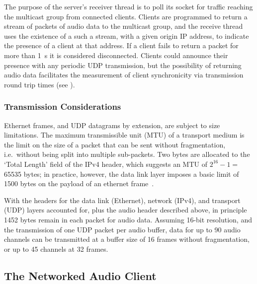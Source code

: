 
The purpose of the server's receiver thread is to poll its socket for traffic
reaching the multicast group from connected clients.
Clients are programmed to return a stream of packets of audio data to the
multicast group, and the receive thread uses the existence of a such a stream,
with a given origin IP address, to indicate the presence of a client at that
address.
If a client fails to return a packet for more than \qty{1}{\second} it is
considered disconnected.
Clients could announce their presence with any periodic UDP transmission, but
the possibility of returning audio data facilitates the measurement of client
synchronicity via transmission round trip times (see
).

\subsubsection{Transmission Considerations}\label{subsubsec:transmission-considerations}

Ethernet frames, and UDP datagrams by extension, are subject to size
limitations.
The maximum transmissible unit (MTU) of a transport medium is the limit on the
size of a packet that can be sent without fragmentation, i.e.\ without being
split into multiple sub-packets.
Two bytes are allocated to the `Total Length' field of the IPv4 header, which
suggests an MTU of $2^{16}-1=~$\num{65535} bytes;
in practice, however, the data link layer imposes a basic limit of \num{1500}
bytes on the payload of an ethernet
frame~\citep{schiavoni_alternatives_2013,ieee_ieee_2018}.

With the headers for the data link (Ethernet), network (IPv4), and transport
(UDP) layers accounted for, plus the audio header described above, in principle
\num{1452} bytes remain in each packet for audio data.
Assuming 16-bit resolution, and the transmission of one UDP packet per audio
buffer, data for up to 90 audio channels can be transmitted at a buffer size of
16 frames without fragmentation, or up to 45 channels at 32 frames.

\subsection{The Networked Audio Client}\label{subsec:networked-audio-client}

